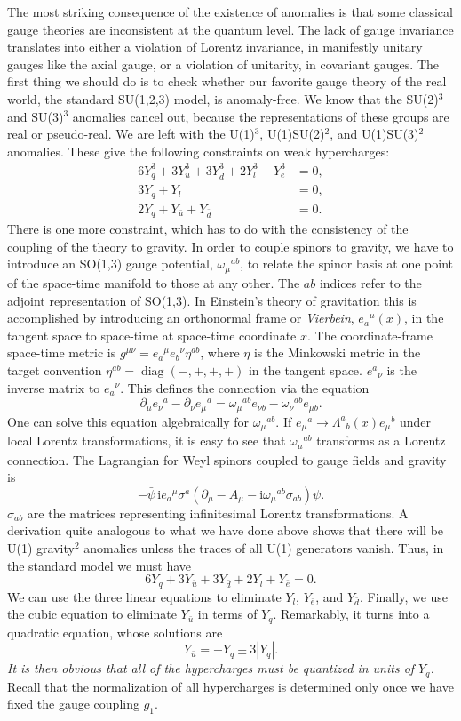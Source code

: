 The most striking consequence of the existence of anomalies is that some
classical gauge theories are inconsistent at the quantum level. The lack of
gauge invariance translates into either a violation of Lorentz invariance, in
manifestly unitary gauges like the axial gauge, or a violation of unitarity, in
covariant gauges. The first thing we should do is to check whether our
favorite gauge theory of the real world, the standard SU(1,2,3) model, is
anomaly-free. We know that the SU(2)$^3$ and SU(3)$^3$ anomalies cancel out,
because the representations of these groups are real or pseudo-real. We are
left with the U(1)$^3$, U(1)SU(2)$^2$, and U(1)SU(3)$^2$ anomalies. These give
the following constraints on weak hypercharges:
\[
\begin{aligned}
  6Y_q^3+3Y_{\bar u}^3+3Y_{\bar d}^3+2Y_l^3+Y_{\bar e}^3&=0,\\
  3Y_q+Y_l&=0,\\
  2Y_q+Y_{\bar u}+Y_{\bar d}&=0 .
\end{aligned}
\]
There is one more constraint, which has to do with the consistency of the
coupling of the theory to gravity. In order to couple spinors to gravity, we
have to introduce an SO(1,3) gauge potential, $\omega_\mu{}^{ab}$, to relate the
spinor basis at one point of the space-time manifold to those at any other.
The $ab$ indices refer to the adjoint representation of SO(1,3). In Einstein's
theory of gravitation this is accomplished by introducing an orthonormal frame
or \emph{Vierbein}, $e_a{}^\mu(x)$, in the tangent space to space-time at
space-time coordinate $x$. The coordinate-frame space-time metric is
$g^{\mu\nu}=e_a{}^\mu e_b{}^\nu\eta^{ab}$, where $\eta$ is the Minkowski metric
in the target convention $\eta^{ab}=\operatorname{diag}(-,+,+,+)$ in the tangent
space. $e^a{}_{\nu}$ is the inverse matrix to $e_a{}^\nu$. This
defines the connection via the equation
\[
  \partial_\mu e_\nu{}^a-\partial_\nu e_\mu{}^a
  =\omega_\mu{}^{ab}e_{\nu b}-\omega_\nu{}^{ab}e_{\mu b} .
\]
One can solve this equation algebraically for $\omega_\mu{}^{ab}$. If
$e_\mu{}^a\longrightarrow\Lambda^a{}_b(x)e_\mu{}^b$ under local Lorentz
transformations, it is easy to see that $\omega_\mu{}^{ab}$ transforms as a
Lorentz connection. The Lagrangian for Weyl spinors coupled to gauge fields
and gravity is
\[
  -\bar\psi\,\mathrm{i}e_a{}^\mu\sigma^a
  (\partial_\mu-A_\mu-\mathrm{i}\omega_\mu{}^{ab}\sigma_{ab})\psi .
\]
$\sigma_{ab}$ are the matrices representing infinitesimal Lorentz
transformations. A derivation quite analogous to what we have done above
shows that there will be U(1) gravity$^2$ anomalies unless the traces of all
U(1) generators vanish. Thus, in the standard model we must have
\[
  6Y_q+3Y_{\bar u}+3Y_{\bar d}+2Y_l+Y_{\bar e}=0 .
\]
We can use the three linear equations to eliminate $Y_l$, $Y_{\bar e}$, and
$Y_{\bar d}$. Finally, we use the cubic equation to eliminate $Y_{\bar u}$
in terms of $Y_q$. Remarkably, it turns into a quadratic equation, whose
solutions are
\[
  Y_{\bar u}=-Y_q\pm3|Y_q| .
\]
\emph{It is then obvious that all of the hypercharges must be quantized in
units of $Y_q$.} Recall that the normalization of all hypercharges is
determined only once we have fixed the gauge coupling $g_1$.

